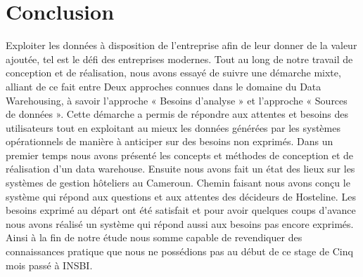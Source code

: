 \chapter*{Conclusion}

Exploiter les données à disposition de l’entreprise afin de leur donner de la valeur ajoutée, tel est le défi des entreprises modernes. Tout au long de notre travail de conception et de réalisation, nous avons essayé de suivre une démarche mixte, alliant de ce fait entre Deux approches connues dans le domaine du Data Warehousing, à savoir l’approche « Besoins d’analyse » et l’approche « Sources de données ». Cette démarche a permis de répondre aux attentes et besoins des utilisateurs tout en exploitant au mieux les données générées par les systèmes opérationnels de manière à anticiper sur des besoins non exprimés. Dans un premier temps nous avons présenté les concepts et méthodes de conception et de réalisation d’un data warehouse. Ensuite nous avons fait un état des lieux sur les systèmes de gestion hôteliers au Cameroun. Chemin faisant nous avons conçu le système qui répond aux questions et aux attentes des décideurs de Hosteline. Les besoins exprimé au départ ont été satisfait et pour avoir quelques coups d’avance nous avons réalisé un système qui répond aussi aux besoins pas encore exprimés. Ainsi à la fin de notre étude nous somme capable de revendiquer des connaissances pratique que nous ne possédions pas au début de ce stage de Cinq mois passé à INSBI. 